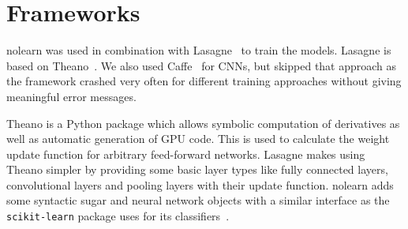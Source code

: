 
\section{Frameworks}\label{sec:frameworks}
nolearn was used in combination with Lasagne~\cite{sander_dieleman_2015_27878}
to train the models. Lasagne is based on Theano~\cite{Bergstra2010}. We also
used Caffe~\cite{Jia2014} for \glspl{CNN}, but skipped that approach as the
framework crashed very often for different training approaches without giving
meaningful error messages.

Theano is a Python package which allows symbolic computation of derivatives as
well as automatic generation of GPU code. This is used to calculate the weight
update function for arbitrary feed-forward networks. Lasagne makes using Theano
simpler by providing some basic layer types like fully connected layers,
convolutional layers and pooling layers with their update function. nolearn
adds some syntactic sugar and neural network objects with a similar interface
as the \verb+scikit-learn+ package uses for its classifiers~\cite{scikit-learn}.